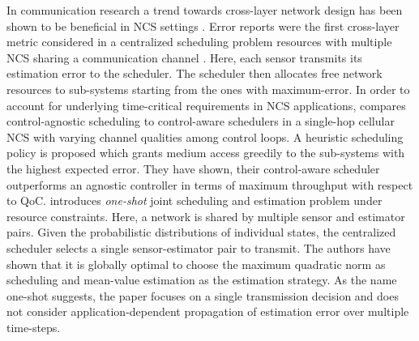 In communication research a trend towards cross-layer network design has been
shown to be beneficial in NCS settings \cite{park2017wireless}. Error reports
were the first cross-layer metric considered in a centralized scheduling problem
resources with multiple NCS sharing a communication channel
\cite{walsh2001scheduling}. Here, each sensor transmits its estimation error to
the scheduler. The scheduler then allocates free network resources to
sub-systems starting from the ones with maximum-error. In order to account for
underlying time-critical requirements in NCS applications,
\cite{vilgelm2017control} compares control-agnostic scheduling to control-aware
schedulers in a single-hop cellular NCS with varying channel qualities among
control loops. A heuristic scheduling policy is proposed which grants medium
access greedily to the sub-systems with the highest expected error. They have
shown, their control-aware scheduler outperforms an agnostic controller in terms
of maximum throughput with respect to QoC. \cite{vasconcelos2017optimal}
introduces \textit{one-shot} joint scheduling and estimation problem under
resource constraints. Here, a network is shared by multiple sensor and estimator
pairs. Given the probabilistic distributions of individual states, the
centralized scheduler selects a single sensor-estimator pair to transmit. The
authors have shown that it is globally optimal to choose the maximum quadratic
norm as scheduling and mean-value estimation as the estimation strategy. As the
name one-shot suggests, the paper focuses on a single transmission decision and
does not consider application-dependent propagation of estimation error over
multiple time-steps.

